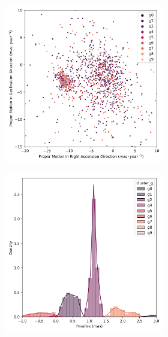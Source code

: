 \documentclass[11pt,a4paper,english,twocolumn]{article}
\begin{document}
\begin{figure}[htbp]
\begin{subfigure}{\columnwidth}
\begin{subfigure}[t]{0.30\textwidth}
    \end{subfigure}
  \end{subfigure}
  \centering
  \begin{subfigure}{\columnwidth}
    \centering
    \begin{subfigure}[t]{0.30\textwidth}
      \centering
      \includegraphics[width=\textwidth]{../figures/ngc_2682/dec_pm_filtered_ngc_2682.png}
    \end{subfigure}
    \hfill
    \begin{subfigure}[t]{0.30\textwidth}
      \centering
      \includegraphics[width=\textwidth]{../figures/ngc_2682/dec_parallax_filtered_ngc_2682.png}

\end{subfigure}
\end{subfigure}
\end{figure}
\end{document}
